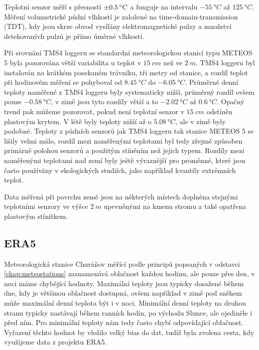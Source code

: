 Teplotní senzor měří s přesností $\SI{\pm 0.5}{\degree C}$ a funguje na intervalu $\SI{-55}{\degree C}$ až $\SI{125}{\degree C}$. Měření volumetrické půdní vlhkostí je založené na time-domain-transmission (TDT), kdy jsou skrze obvod vysílány elektromagnetické pulzy a množství detekovaných pulzů je přímo úměrné vlhkosti. 

Při srovnání TMS4 loggeru se standardní meteorologickou stanicí typu METEOS 5 byla pozorována větší variabilita u teplot v $\SI{15}{cm}$ než ve $\SI{2}{m}$. TMS4 loggeru byl instalován na krátkém posekaném trávníku, tři metry od stanice, a rozdíl teplot při hodinovém měření se pohyboval od $\SI{+8.45}{\degree C}$ do $\SI{-6.05}{\degree C}$. Průměrné denní teploty naměřené z TMS4 loggeru byly systematicky nižší, průměrný rozdíl ovšem pouze $\SI{-0.58}{\degree C}$, v zimě jsou tyto rozdíly větší a to $\SI{-2.02}{\degree C}$ až $\SI{0.6}{\degree C}$. Opačný trend pak můžeme pozorovat, pokud není teplotní senzor v $\SI{15}{cm}$ odstíněn plastovým krytem. V létě byly teploty nižší až o $\SI{5.08}{\degree C}$, ale v zimě byly podobné. Teploty z půdních senzorů jak TMS4 loggeru tak stanice METEOS 5 se lišily velmi málo, rozdíl mezi naměřenými teplotami byl tedy zřejmě způsoben primárně polohou senzorů a použitým stíněním než jejich typem. Rozdíly mezi naměřenými teplotami nad zemí byly ještě výraznější pro proměnné, které jsou často používány v ekologických studiích, jako například kvantily extrémních teplot\cite{WildJan2019Caer}. 

Data měřená při povrchu země jsou na některých místech doplněna stejnými teplotními senzory ve výšce $\SI{2}{m}$ upevněnými na kmenu stromu a také opatřena plastovým stínítkem.

\subsection{ERA5}
Meteorologická stanice Churáňov měřící podle principů popsaných v odstavci \ref{chap:meteostations} zaznamenává oblačnost každou hodinu, ale pouze přes den, v noci máme chybějící hodnoty. Maximální teploty jsou typicky dosažené během dne, kdy je většinou oblačnost dostupná, ovšem například v zimě pod sněhem může maximální denní teplota být i v noci. Minimální denní teploty na druhou stranu typicky nastávají během ranních hodin, po východu Slunce, ale ojediněle i před ním. Pro minimální teploty nám tedy často chybí odpovídající oblačnost. Vyřazení těchto hodnot by vložilo velký bias do dat, tudíž byla zvolena cesta, kdy využijeme data z projektu ERA5.


